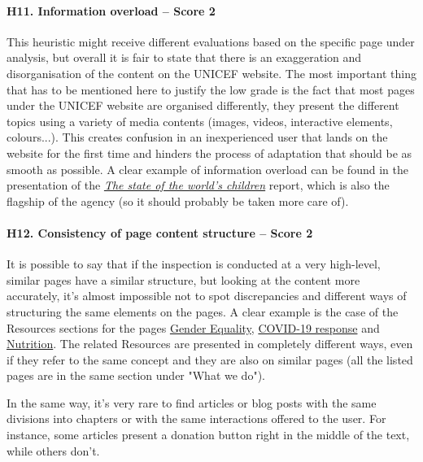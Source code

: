\paragraph*{H11. Information overload – Score 2}
This heuristic might receive different evaluations based on the specific page under analysis, but overall it is fair to state that there is an exaggeration and disorganisation of the content on the UNICEF website. The most important thing that has to be mentioned here to justify the low grade is the fact that most pages under the UNICEF website are organised differently, they present the different topics using a variety of media contents (images, videos, interactive elements, colours...). This creates confusion in an inexperienced user that lands on the website for the first time and hinders the process of adaptation that should be as smooth as possible.
A clear example of information overload can be found in the presentation of the \href{https://www.unicef.org/reports/state-of-worlds-children}{\textit{The state of the world's children}} report, which is also the flagship of the agency (so it should probably be taken more care of).


\paragraph*{H12. Consistency of page content structure – Score 2}
It is possible to say that if the inspection is conducted at a very high-level, similar pages have a similar structure, but looking at the content more accurately, it's almost impossible not to spot discrepancies and different ways of structuring the same elements on the pages. 
A clear example is the case of the Resources sections for the pages \href{https://www.unicef.org/gender-equality}{Gender Equality}, \href{https://www.unicef.org/coronavirus/covid-19}{COVID-19 response} and \href{https://www.unicef.org/nutrition}{Nutrition}. The related Resources are presented in completely different ways, even if they refer to the same concept and they are also on similar pages (all the listed pages are in the same section under "What we do").

In the same way, it's very rare to find articles or blog posts with the same divisions into chapters or with the same interactions offered to the user. For instance, some articles present a donation button right in the middle of the text, while others don't.



